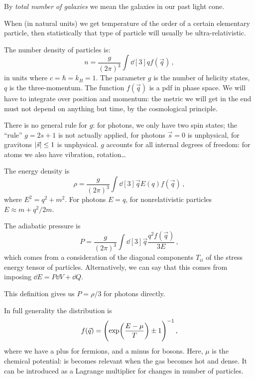 \documentclass[main.tex]{subfiles}
\begin{document}
By \emph{total number of galaxies} we mean the galaxies in our past light cone.

When (in natural units) we get temperature of the order of a certain elementary particle, then statistically that type of particle will usually be ultra-relativistic.

The number density of particles is: 
%
\begin{equation}
  n = \frac{g}{(2 \pi )^3} \int \dd[3]{q} f(\vec{q})
\,,
\end{equation}
%
in units where \(c= \hbar = k_B = 1\). The parameter \(g\) is the number of helicity states, \(q\) is the three-momentum. The function \(f(\vec{q})\) is a pdf in phase space.
We will have to integrate  over position and momentum: the metric we will get in the end must not depend on anything but time, by the cosmological principle.

There is no general rule for \(g\): for photons, we only have two spin states; the ``rule'' \(g = 2s +1 \) is not actually applied, for photons \(\vec{s} = 0\) is unphysical, for gravitons \(\abs{\vec{s}} \leq 1 \) is unphysical.
\(g\) accounts for all internal degrees of freedom: for atoms we also have vibration, rotation\dots

The energy density is 
%
\begin{equation}
  \rho = \frac{g}{(2 \pi )^3} \int \dd[3]{\vec{q}} E(q) f(\vec{q}) 
\,,
\end{equation}
%
where \(E^2 = q^2 + m^2\). For photons \(E = q\), for nonrelativistic particles \(E \approx m + q^2 / 2m\).

The adiabatic pressure is 
%
\begin{equation}
  P = \frac{g}{(2 \pi )^3} \int \dd[3]{\vec{q}} \frac{q^2 f(\vec{q})}{3E} 
\,,
\end{equation}
%
which comes from a consideration of the diagonal components \(T_{ii}\) of the stress energy tensor of particles. Alternatively, we can say that this comes from imposing \(\dd{E} = P \dd{V} + \dd{Q} \).

This definition gives us \(P = \rho /3\) for photons directly.

In full generality the distribution is 
%
\begin{equation}
  f(\vec{q}) = \qty(\exp(\frac{E- \mu }{T}) \pm 1 )^{-1}
\,,
\end{equation}
%
where we have a plus for fermions, and a minus for bosons. Here, \(\mu \) is the chemical potential: is becomes relevant when the gas becomes hot and dense.
It can be introduced as a Lagrange multiplier for changes in number of particles.
\end{document}
